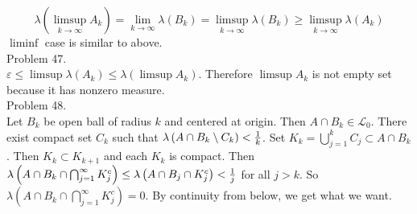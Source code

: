 \begin{equation*}
	\lambda\left ( \limsup_{k\rightarrow \infty } A_k \right ) = \lim_{k \rightarrow \infty } \lambda \left ( B_k \right ) = \limsup_{k\rightarrow \infty} \lambda \left ( B_k \right ) \geq \limsup_{k\rightarrow \infty}\lambda \left ( A_k \right )
\end{equation*}
$\liminf$ case is similar to above.\\

Problem 47. \\

$\varepsilon \leq \limsup \lambda \left ( A_k \right ) \leq \lambda \left ( \limsup A_k \right )$. Therefore $\limsup A_k$ is not empty set because it has nonzero measure. \\

Problem 48. \\

Let $B_k$ be open ball of radius $k$ and centered at origin. Then $A \cap B_k \in \mathcal{L}_{0}$. There exist compact set $C_k$ such that $\lambda \left ( A\cap B_k \setminus C_k \right ) < {1 \over k} $. Set $K_k = \bigcup_{j=1}^{k}C_j \subset A\cap B_k$. Then $K_k \subset K_{k+1}$ and each $K_k$ is compact.
Then $\lambda \left ( A \cap B_k \cap \bigcap_{j=1}^{\infty}K_{j}^{c} \right ) \leq \lambda \left ( A \cap B_j \cap K_{j}^{c} \right ) < {1 \over j }$ for all $j > k$. So $\lambda \left ( A \cap B_k \cap \bigcap_{j=1}^{\infty} K_{j}^{c} \right ) = 0$. By continuity from below, we get what we want.\\



